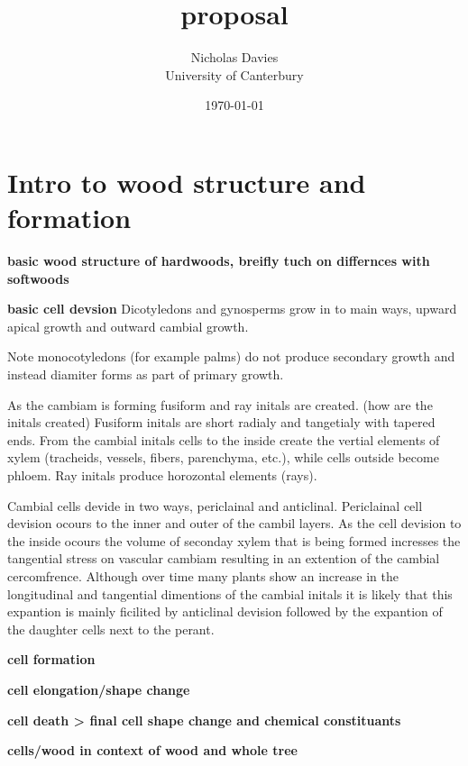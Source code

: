 \documentclass{article}
\begin{document}
\title{proposal}

\author{Nicholas Davies\\ University of Canterbury }

\date{\today}



\maketitle




\section{Intro to wood structure and formation}
\textbf{basic wood structure of hardwoods, breifly tuch on differnces with softwoods}

\textbf{basic cell devsion}
Dicotyledons and gynosperms grow in to main ways, upward apical growth and outward cambial growth.

Note monocotyledons (for example palms) do not produce secondary growth and instead diamiter
forms as part of primary growth.

As the cambiam is forming fusiform and ray initals are created.
(how are the initals created)
Fusiform initals are short radialy and tangetialy with tapered
ends. From the cambial initals cells to the inside create the vertial elements
of xylem (tracheids, vessels, fibers, parenchyma, etc.), while cells outside become phloem.
Ray initals produce horozontal elements (rays).

Cambial cells devide in two ways, periclainal and anticlinal.
Periclainal cell devision ocours to the inner and outer of the cambil layers.
As the cell devision to the inside ocours the volume of seconday xylem that is being
formed incresses the tangential stress on vascular cambiam resulting in an
extention of the cambial cercomfrence. Although over time many plants show an
increase in the longitudinal and tangential dimentions of the cambial initals it is
likely that this expantion is mainly ficilited by anticlinal devision followed by the
expantion of the daughter cells next to the perant.

\textbf{cell formation}

\textbf{cell elongation/shape change}

\textbf{cell death > final cell shape change and chemical constituants}

\textbf{cells/wood in context of wood and whole tree}
\end{document}
